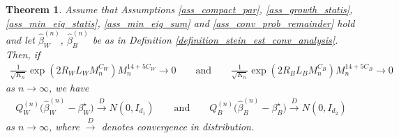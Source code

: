 \documentclass{article}
\newtheorem{Theorem}{Theorem}[section]
\begin{document}
\begin{Theorem} \label{theorem_asym_norm_conv}
    Assume that Assumptions \ref{ass_compact_par}, \ref{ass_growth_statis}, \ref{ass_min_eig_statis}, \ref{ass_min_eig_sum} and \ref{ass_conv_prob_remainder} hold and let $\hat{\beta}_W^{(n)}$, $\hat{\beta}_B^{(n)}$ be as in Definition \ref{definition_stein_est_conv_analysis}. Then, if 
    \begin{align*}
     \frac{1}{\sqrt{K_n}}  \exp(2R_WL_WM_n^{C_W}) M_n^{14+5C_W}  \rightarrow 0 \qquad \text{and} \qquad \frac{1}{\sqrt{K_n}} \exp(2R_BL_B M_n^{C_B}) M_n^{14+5C_B} \rightarrow 0
    \end{align*}
    as $ n \rightarrow \infty $, we have
    \begin{align*}
        Q_W^{(n)} \big( \hat{\beta}_W^{(n)}-\beta_W^{\star}\big) \xrightarrow{D} N(0,I_{d_1}) \qquad \text{and} \qquad Q_B^{(n)} \big( \hat{\beta}_B^{(n)}-\beta_B^{\star}\big) \xrightarrow{D} N(0,I_{d_2})
    \end{align*}
    as $n \rightarrow \infty$, where $\xrightarrow{D}$ denotes convergence in distribution.
\end{Theorem}
\end{document}
